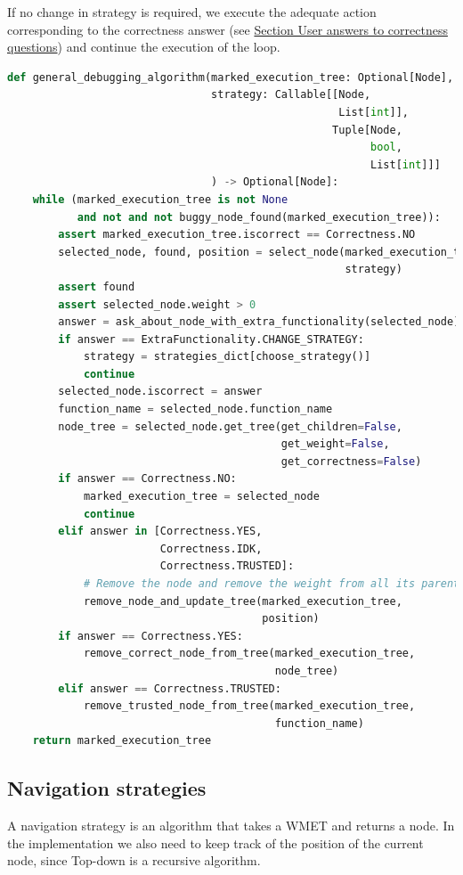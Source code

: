 If no change in strategy is required, we execute the adequate action corresponding to the correctness answer (see \hyperref[implementation:correctnessAnswers]{Section User answers to correctness questions}) and continue the execution of the loop.

\begin{lstlisting}[language=Python, caption=General debugging algorithm implementation]
def general_debugging_algorithm(marked_execution_tree: Optional[Node],
                                strategy: Callable[[Node,
                                                    List[int]],
                                                   Tuple[Node,
                                                         bool,
                                                         List[int]]]
                                ) -> Optional[Node]:
    while (marked_execution_tree is not None
           and not and not buggy_node_found(marked_execution_tree)):
        assert marked_execution_tree.iscorrect == Correctness.NO
        selected_node, found, position = select_node(marked_execution_tree,
                                                     strategy)
        assert found
        assert selected_node.weight > 0
        answer = ask_about_node_with_extra_functionality(selected_node)
        if answer == ExtraFunctionality.CHANGE_STRATEGY:
            strategy = strategies_dict[choose_strategy()]
            continue
        selected_node.iscorrect = answer
        function_name = selected_node.function_name
        node_tree = selected_node.get_tree(get_children=False,
                                           get_weight=False,
                                           get_correctness=False)
        if answer == Correctness.NO:
            marked_execution_tree = selected_node
            continue
        elif answer in [Correctness.YES,
                        Correctness.IDK,
                        Correctness.TRUSTED]:
            # Remove the node and remove the weight from all its parents
            remove_node_and_update_tree(marked_execution_tree,
                                        position)
        if answer == Correctness.YES:
            remove_correct_node_from_tree(marked_execution_tree,
                                          node_tree)
        elif answer == Correctness.TRUSTED:
            remove_trusted_node_from_tree(marked_execution_tree,
                                          function_name)
    return marked_execution_tree
\end{lstlisting}
\subsection{Navigation strategies}
\label{implementation:Strategies}
A navigation strategy is an algorithm that takes a WMET and returns a node.
In the implementation we also need to keep track of the position of the current node, since Top-down is a recursive algorithm.

